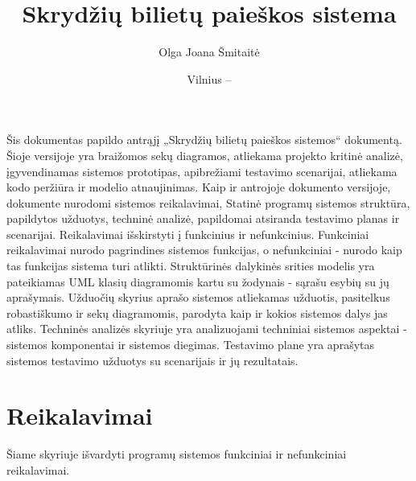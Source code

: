 \documentclass{VUMIFPSkursinis}
\title{Skrydžių bilietų paieškos sistema}
\author{Olga Joana Šmitaitė}
\date{Vilnius – \the\year}
\begin{document}
    \maketitle
      
        \tableofcontents
      
             Šis dokumentas papildo antrąjį „Skrydžių bilietų paieškos sistemos“ dokumentą. Šioje versijoje yra braižomos sekų diagramos, atliekama projekto kritinė analizė, įgyvendinamas sistemos prototipas, apibrežiami testavimo scenarijai, atliekama kodo peržiūra ir modelio atnaujinimas. Kaip ir antrojoje dokumento versijoje, dokumente nurodomi sistemos reikalavimai, Statinė programų sistemos struktūra, papildytos užduotys, techninė analizė, papildomai atsiranda testavimo planas ir scenarijai.
             Reikalavimai išskirstyti į funkcinius ir nefunkcinius. Funkciniai reikalavimai nurodo pagrindines sistemos funkcijas, o nefunkciniai - nurodo kaip tas funkcijas sistema turi atlikti. Struktūrinės dalykinės srities modelis yra pateikiamas UML klasių diagramomis kartu su žodynais - sąrašu esybių su jų aprašymais. Užduočių skyrius aprašo sistemos atliekamas užduotis,  pasitelkus robastiškumo ir sekų diagramomis, parodyta kaip ir kokios sistemos dalys jas atliks. Techninės analizės skyriuje yra analizuojami techniniai sistemos aspektai - sistemos komponentai ir sistemos diegimas. Testavimo plane yra aprašytas sistemos testavimo užduotys su scenarijais ir jų rezultatais.
        \section{Reikalavimai}
			Šiame skyriuje išvardyti programų sistemos funkciniai ir nefunkciniai reikalavimai.
\end{document}
